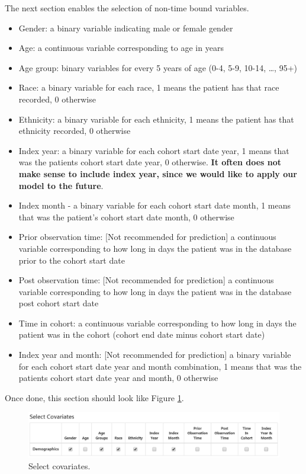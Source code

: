 \documentclass[11pt]{book}
\providecommand{\tightlist}{%
  \setlength{\itemsep}{0pt}\setlength{\parskip}{0pt}}
\theoremstyle{definition}
\theoremstyle{definition}
\theoremstyle{definition}
\theoremstyle{remark}
\begin{document}
The next section enables the selection of non-time bound variables.

\begin{itemize}
\tightlist
\item
  Gender: a binary variable indicating male or female gender
\item
  Age: a continuous variable corresponding to age in years
\item
  Age group: binary variables for every 5 years of age (0-4, 5-9, 10-14, \ldots, 95+)
\item
  Race: a binary variable for each race, 1 means the patient has that race recorded, 0 otherwise
\item
  Ethnicity: a binary variable for each ethnicity, 1 means the patient has that ethnicity recorded, 0 otherwise
\item
  Index year: a binary variable for each cohort start date year, 1 means that was the patients cohort start date year, 0 otherwise. \textbf{It often does not make sense to include index year, since we would like to apply our model to the future}.
\item
  Index month - a binary variable for each cohort start date month, 1 means that was the patient's cohort start date month, 0 otherwise
\item
  Prior observation time: {[}Not recommended for prediction{]} a continuous variable corresponding to how long in days the patient was in the database prior to the cohort start date
\item
  Post observation time: {[}Not recommended for prediction{]} a continuous variable corresponding to how long in days the patient was in the database post cohort start date
\item
  Time in cohort: a continuous variable corresponding to how long in days the patient was in the cohort (cohort end date minus cohort start date)
\item
  Index year and month: {[}Not recommended for prediction{]} a binary variable for each cohort start date year and month combination, 1 means that was the patients cohort start date year and month, 0 otherwise
\end{itemize}

Once done, this section should look like Figure \ref{fig:covariateSettings2}.

\begin{figure}

{\centering \includegraphics[width=1\linewidth]{images/PatientLevelPrediction/covariateSettings2} 

}

\caption{Select covariates.}\label{fig:covariateSettings2}
\end{figure}
\end{document}
